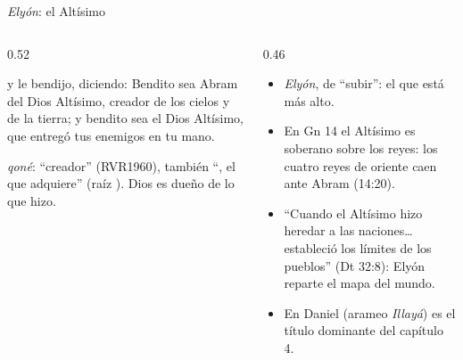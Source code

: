 \begin{frame}{\emph{Elyón}: el Altísimo}
\begin{columns}[t,onlytextwidth]
\begin{column}{0.52\textwidth}
\begin{cita}y le bendijo, diciendo: Bendito sea Abram del Dios Altísimo, creador de los cielos y de la tierra; y bendito sea el Dios Altísimo, que entregó tus enemigos en tu mano.\end{cita}
\begin{center}\end{center}
\scriptsize {} \emph{qoné}: ``creador'' (RVR1960), también ``, el que adquiere'' (raíz ). Dios es dueño de lo que hizo.
\end{column}
\begin{column}{0.46\textwidth}\small
\begin{itemize}
\item {} \emph{Elyón}, de  ``subir'': el que está más alto.
\item En Gn 14 el Altísimo es soberano sobre los reyes: los cuatro reyes de oriente caen ante Abram (14:20).
\item ``Cuando el Altísimo hizo heredar a las naciones\ldots{} estableció los límites de los pueblos'' (Dt 32:8): Elyón reparte el mapa del mundo.
\item En Daniel (arameo  \emph{Illayá}) es el título dominante del capítulo 4.
\end{itemize}
\end{column}
\end{columns}\par\smallskip
{}
\end{frame}

